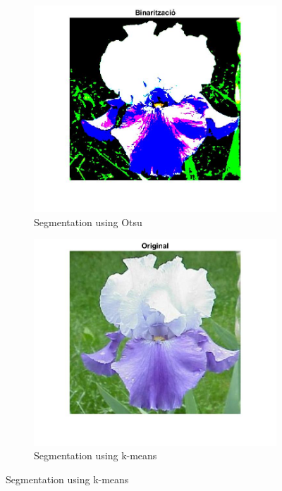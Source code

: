 \documentclass[11]{article}
\begin{document}
\begin{figure}[H]
    \begin{subfigure}[t]{0.45\textwidth}
    \centering
  \includegraphics[scale=0.13]{images/segmentation0.jpg}
    \caption{Segmentation using Otsu}
    \label{segmentation0}
    \end{subfigure}
    \begin{subfigure}[t]{0.45\textwidth}
    \centering
    \includegraphics[scale=0.35]{images/segmentation1.jpg}
    \caption{Segmentation using k-means}
    \label{segmentation1}
    \end{subfigure}
\end{figure}
\end{document}
